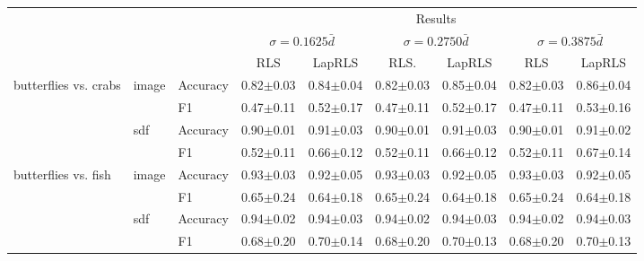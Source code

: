 \documentclass[anon,11pt]{9520} %
\begin{document}
\begin{table}
\scriptsize
\begin{center}
\begin{tabular}{l|l|l|cc|cc|cc|}
& & & \multicolumn{6}{c}{Results} \\ 
  & & & \multicolumn{2}{|c|}{$\sigma=0.1625 \bar{d}$}
       & \multicolumn{2}{|c|}{$\sigma=0.2750 \bar{d}$}
       & \multicolumn{2}{|c|}{$\sigma=0.3875 \bar{d}$}\\ 
& & & RLS & LapRLS & RLS. & LapRLS & RLS & LapRLS\\ \hline 

\multirow{4}{*}{butterflies vs. crabs}
& \multirow{2}{*}{image} & \multirow{1}{*}{Accuracy}& 0.82$\pm$0.03& 0.84$\pm$0.04& 0.82$\pm$0.03& 0.85$\pm$0.04& 0.82$\pm$0.03& 0.86$\pm$0.04\\ 
& & \multirow{1}{*}{F1}& 0.47$\pm$0.11& 0.52$\pm$0.17& 0.47$\pm$0.11& 0.52$\pm$0.17& 0.47$\pm$0.11& 0.53$\pm$0.16\\ \cline{2-9} 

& \multirow{2}{*}{sdf} & \multirow{1}{*}{Accuracy}& 0.90$\pm$0.01& 0.91$\pm$0.03& 0.90$\pm$0.01& 0.91$\pm$0.03& 0.90$\pm$0.01& 0.91$\pm$0.02\\ 
& & \multirow{1}{*}{F1}& 0.52$\pm$0.11& 0.66$\pm$0.12& 0.52$\pm$0.11& 0.66$\pm$0.12& 0.52$\pm$0.11& 0.67$\pm$0.14\\ \cline{2-9} 

\multirow{4}{*}{butterflies vs. fish}
& \multirow{2}{*}{image} & \multirow{1}{*}{Accuracy}& 0.93$\pm$0.03& 0.92$\pm$0.05& 0.93$\pm$0.03& 0.92$\pm$0.05& 0.93$\pm$0.03& 0.92$\pm$0.05\\ 
& & \multirow{1}{*}{F1}& 0.65$\pm$0.24& 0.64$\pm$0.18& 0.65$\pm$0.24& 0.64$\pm$0.18& 0.65$\pm$0.24& 0.64$\pm$0.18\\ \cline{2-9} 

& \multirow{2}{*}{sdf} & \multirow{1}{*}{Accuracy}& 0.94$\pm$0.02& 0.94$\pm$0.03& 0.94$\pm$0.02& 0.94$\pm$0.03& 0.94$\pm$0.02& 0.94$\pm$0.03\\ 
& & \multirow{1}{*}{F1}& 0.68$\pm$0.20& 0.70$\pm$0.14& 0.68$\pm$0.20& 0.70$\pm$0.13& 0.68$\pm$0.20& 0.70$\pm$0.13\\ \cline{2-9} 


\end{tabular}
\end{center}
\end{table}
\end{document}
